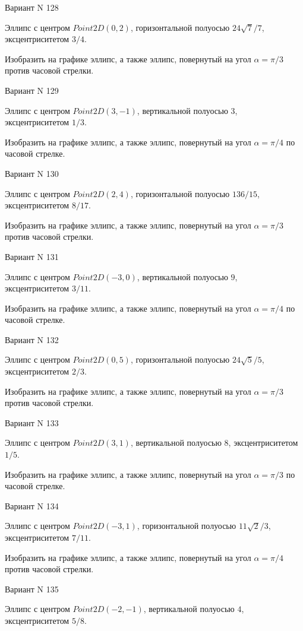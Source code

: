 \documentclass[11pt]{report}
\begin{document}
Вариант N 128

Эллипс с центром $Point2D\left(0, 2\right)$, горизонтальной полуосью $24 \sqrt{7} / 7$, эксцентриситетом $3 / 4$.

    Изобразить на графике эллипс, а также эллипс, повернутый на угол $\alpha = $$\pi / 3$ против часовой стрелки.

Вариант N 129

Эллипс с центром $Point2D\left(3, -1\right)$, вертикальной полуосью $3$, эксцентриситетом $1 / 3$.

    Изобразить на графике эллипс, а также эллипс, повернутый на угол $\alpha = $$\pi / 4$ по часовой стрелке.

Вариант N 130

Эллипс с центром $Point2D\left(2, 4\right)$, горизонтальной полуосью $136 / 15$, эксцентриситетом $8 / 17$.

    Изобразить на графике эллипс, а также эллипс, повернутый на угол $\alpha = $$\pi / 3$ против часовой стрелки.

Вариант N 131

Эллипс с центром $Point2D\left(-3, 0\right)$, вертикальной полуосью $9$, эксцентриситетом $3 / 11$.

    Изобразить на графике эллипс, а также эллипс, повернутый на угол $\alpha = $$\pi / 4$ по часовой стрелке.

Вариант N 132

Эллипс с центром $Point2D\left(0, 5\right)$, горизонтальной полуосью $24 \sqrt{5} / 5$, эксцентриситетом $2 / 3$.

    Изобразить на графике эллипс, а также эллипс, повернутый на угол $\alpha = $$\pi / 3$ против часовой стрелки.

Вариант N 133

Эллипс с центром $Point2D\left(3, 1\right)$, вертикальной полуосью $8$, эксцентриситетом $1 / 5$.

    Изобразить на графике эллипс, а также эллипс, повернутый на угол $\alpha = $$\pi / 3$ по часовой стрелке.

Вариант N 134

Эллипс с центром $Point2D\left(-3, 1\right)$, горизонтальной полуосью $11 \sqrt{2} / 3$, эксцентриситетом $7 / 11$.

    Изобразить на графике эллипс, а также эллипс, повернутый на угол $\alpha = $$\pi / 4$ против часовой стрелки.

Вариант N 135

Эллипс с центром $Point2D\left(-2, -1\right)$, вертикальной полуосью $4$, эксцентриситетом $5 / 8$.
\end{document}
